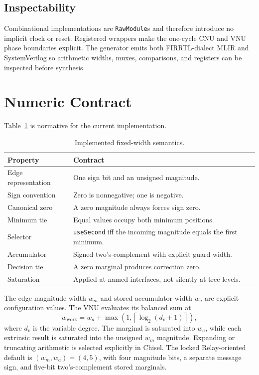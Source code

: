 \documentclass[10pt,conference]{IEEEtran}
\begin{document}
\subsection{Inspectability}
Combinational implementations are \texttt{RawModule}s and therefore introduce
no implicit clock or reset.  Registered wrappers make the one-cycle CNU and VNU
phase boundaries explicit.  The generator emits both FIRRTL-dialect MLIR and
SystemVerilog so arithmetic widths, muxes, comparisons, and registers can be
inspected before synthesis.

\section{Numeric Contract}
Table~\ref{tab:contract} is normative for the current implementation.

\begin{table}[t]
\caption{Implemented fixed-width semantics.}
\label{tab:contract}
\centering
\begin{tabular}{@{}p{}p{}@{}}
\toprule
Property & Contract \\
\midrule
Edge representation & One sign bit and an unsigned magnitude. \\
Sign convention & Zero is nonnegative; one is negative. \\
Canonical zero & A zero magnitude always forces sign zero. \\
Minimum tie & Equal values occupy both minimum positions. \\
Selector & \texttt{useSecond} iff the incoming magnitude equals the first minimum. \\
Accumulator & Signed two's-complement with explicit guard width. \\
Decision tie & A zero marginal produces correction zero. \\
Saturation & Applied at named interfaces, not silently at tree levels. \\
\bottomrule
\end{tabular}
\end{table}

The edge magnitude width $w_m$ and stored accumulator width $w_a$ are explicit
configuration values.  The VNU evaluates its balanced sum at
\begin{equation}
 w_{\mathrm{work}} = w_a +
 \max\left(1,\left\lceil\log_2(d_v+1)\right\rceil\right),
\end{equation}
where $d_v$ is the variable degree.  The marginal is saturated into $w_a$,
while each extrinsic result is saturated into the unsigned $w_m$ magnitude.
Expanding or truncating arithmetic is selected explicitly in Chisel.
The locked Relay-oriented default is $(w_m,w_a)=(4,5)$, with four magnitude
bits, a separate message sign, and five-bit two's-complement stored marginals.
\end{document}
